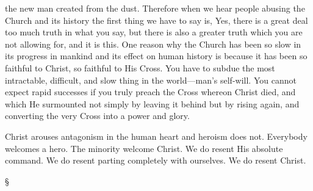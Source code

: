 \documentclass[12pt,a5paper,twoside,titlepage]{book}
\begin{document}
the new man created from the dust. Therefore 
when we hear people abusing the Church 
and its history the first thing we have to say 
is, Yes, there is a great deal too much truth 
in what you say, but there is also a greater 
truth which you are not allowing for, and it 
is this. One reason why the Church has 
been so slow in its progress in mankind and 
its effect on human history is because it has 
been so faithful to Christ, so faithful to His 
Cross. You have to subdue the most intractable, 
difficult, and slow thing in the world---man's 
self-will. You cannot expect rapid successes 
if you truly preach the Cross whereon 
Christ died, and which He surmounted not 
simply by leaving it behind but by rising again, 
and converting the very Cross into a power
and glory. 

Christ arouses antagonism in the human heart 
and heroism does not. Everybody welcomes a 
hero. The minority welcome Christ. We do 
resent His absolute command. We do resent 
parting completely with ourselves. We do 
resent Christ. 

\begin{center} \S \end{center} 
\end{document}

